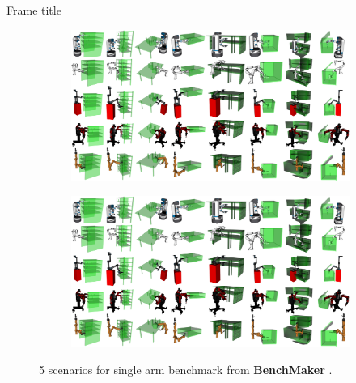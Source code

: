 \documentclass[8pt, compress]{beamer}
\begin{document}
\begin{frame}{Frame title}
\begin{figure}[t]
\begin{subfigure}[t]{0.33\linewidth}
  \end{subfigure}
  \begin{subfigure}[t]{0.33\linewidth}
    \centering
    \includegraphics[width=\linewidth]{figures/problem/problem_2.pdf}
  \end{subfigure}
  \begin{subfigure}[t]{0.33\linewidth}
    \centering
    \includegraphics[width=\linewidth]{figures/problem/problem_3.pdf}
  \end{subfigure}
  \caption{5 scenarios for single arm benchmark from \textbf{BenchMaker} \cite{chamzas2022-motion-bench-maker}.}
\end{figure}
\end{frame}
\end{document}
